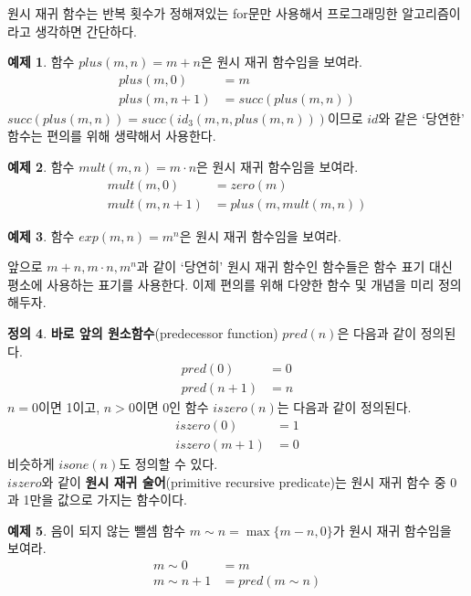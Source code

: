 \documentclass[b5paper, 10pt]{book}
\theoremstyle{definition}
\newtheorem{defn}{정의}[chapter]
\newtheorem{ex}[defn]{예제}
\begin{document}
원시 재귀 함수는 반복 횟수가 정해져있는 for문만 사용해서 프로그래밍한 
알고리즘이라고 생각하면 간단하다.
\begin{ex}
    함수 $plus(m, n) = m+n$은 원시 재귀 함수임을 보여라. 
    \begin{align*}
        plus(m, 0) &= m \\
        plus(m, n+1) &= succ(plus(m, n)) 
    \end{align*}
    $succ(plus(m,n)) = succ(id_3(m, n, plus(m, n)))$이므로 $id$와 같은 `당연한' 함수는 
    편의를 위해 생략해서 사용한다.
\end{ex}
\begin{ex}
    함수 $mult(m,n) = m\cdot n$은 원시 재귀 함수임을 보여라.
    \begin{align*}
        mult(m,0) &= zero(m) \\ 
        mult(m,n+1) &= plus(m,mult(m,n))
    \end{align*}
\end{ex}
\begin{ex}
    함수 $exp(m,n) = m^n$은 원시 재귀 함수임을 보여라.
\end{ex}
앞으로 $m+n, m\cdot n, m^n$과 같이 `당연히' 원시 재귀 함수인 함수들은 함수 
표기 대신 평소에 사용하는 표기를 사용한다. 이제 편의를 위해 다양한 함수 및 개념을 미리 정의해두자. 
\begin{defn}
    \textbf{바로 앞의 원소함수}(predecessor function) $pred(n)$은 다음과 같이 정의된다.
    \begin{align*}
        pred(0) &= 0 \\ 
        pred(n+1) &= n
    \end{align*}
    $n = 0$이면 1이고, $n>0$이면 0인 함수 $iszero(n)$는 다음과 같이 정의된다.
    \begin{align*}
        iszero(0) &= 1 \\ 
        iszero(m+1) &= 0 
    \end{align*}
    비슷하게 $isone(n)$도 정의할 수 있다. \\ 
    $iszero$와 같이
    \textbf{원시 재귀 술어}(primitive recursive predicate)는 원시 재귀 함수 중 0과 1만을 값으로 가지는 함수이다.
\end{defn}
\begin{ex}
    음이 되지 않는 뺄셈 함수 $m \sim n = \max \{ m - n , 0\}$가 원시 재귀 함수임을 보여라.
    \begin{align*}
        m \sim 0 &= m \\ 
        m \sim n+1 &= pred(m \sim n) 
    \end{align*}
\end{ex}
\end{document}
